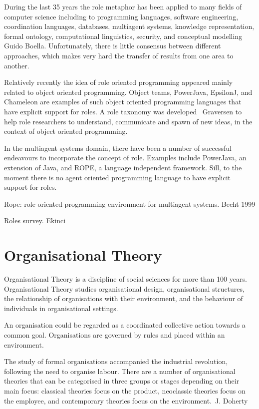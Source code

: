 \documentclass[a4paper,12pt,oneside,fleqn]{book} %
\theoremstyle{plain}
\theoremstyle{definition}
\theoremstyle{remark}
\begin{document}
During the last 35 years the role metaphor has been applied to many fields
of computer science including to programming languages, software
engineering, coordination languages, databases, multiagent systems,
knowledge representation, formal ontology, computational linguistics,
security, and conceptual modelling~\cite{} Guido Boella. Unfortunately,
there is little consensus between different approaches, which makes very
hard the transfer of results from one area to another.

Relatively recently the idea of role oriented programming appeared mainly
related to object oriented programming. Object teams, PowerJava, EpsilonJ,
and Chameleon are examples of such object oriented programming languages
that have explicit support for roles. A role taxonomy was developed~\cite{}
Graversen to help role researchers to understand, communicate and spawn of
new ideas, in the context of object oriented programming.

In the multiagent systems domain, there have been a number of successful
endeavours to incorporate the concept of role. Examples include PowerJava,
an extension of Java, and ROPE, a language independent framework. Sill, to
the moment there is no agent oriented programming language to have explicit
support for roles.

Rope: role oriented programming environment for multiagent systems. Becht
1999

Roles survey. Ekinci
\section{Organisational Theory}  %

Organisational Theory is a discipline of social sciences for more than 100
years. Organisational Theory studies organisational design, organisational
structures, the relationship of organisations with their environment, and
the behaviour of individuals in organisational settings. 

An organisation could be regarded as a coordinated collective action
towards a common goal. Organisations are governed by rules and placed
within an environment. 

The study of formal organisations accompanied the industrial
revolution, following the need to organise labour. There are a number of
organisational theories that can be categorised in three groups or stages
depending on their main focus: classical theories focus on the product,
neoclassic theories focus on the employee, and contemporary theories focus
on the environment.~\cite{}J. Doherty
\end{document}

